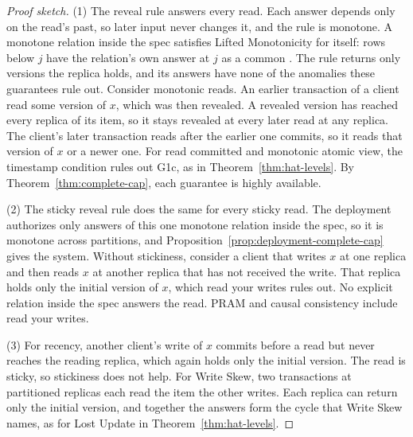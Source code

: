 \begin{proof}[Proof sketch]
(1) The reveal rule answers every read.  Each answer depends only on the read's
past, so later input never changes it, and the rule is monotone.  A monotone
relation inside the spec satisfies Lifted Monotonicity for itself: rows below
$j$ have the relation's own answer at $j$ as a common \outnoun.  The rule
returns only versions the replica holds, and its answers have none of the
anomalies these guarantees rule out.  Consider monotonic reads.  An earlier
transaction of a client read some version of $x$, which was then revealed.
A revealed version has reached every replica of its item, so it stays
revealed at every later read at any replica.  The client's later transaction
reads after the earlier one commits, so it reads that version of $x$ or a newer
one.
For read committed and monotonic atomic view, the timestamp condition rules
out G1c, as in Theorem~\ref{thm:hat-levels}.  By
Theorem~\ref{thm:complete-cap}, each guarantee is highly available.

(2) The sticky reveal rule does the same for every sticky read.  The deployment
authorizes only answers of this one monotone relation inside the spec, so it
is monotone across partitions, and Proposition~\ref{prop:deployment-complete-cap}
gives the system.  Without stickiness, consider a client that writes $x$ at
one replica and then reads $x$ at another replica that has not received the
write.  That replica holds only the initial version of $x$, which read your
writes rules out.  No explicit relation inside the spec answers the read.
PRAM and causal consistency include read your writes.

(3) For recency, another client's write of $x$ commits before a read but never
reaches the reading replica, which again holds only the initial version.  The
read is sticky, so stickiness does not help.  For Write Skew, two transactions
at partitioned replicas each read the item the other writes.  Each replica can
return only the initial version, and together the answers form the cycle that
Write Skew names, as for Lost Update in Theorem~\ref{thm:hat-levels}.
\end{proof}


